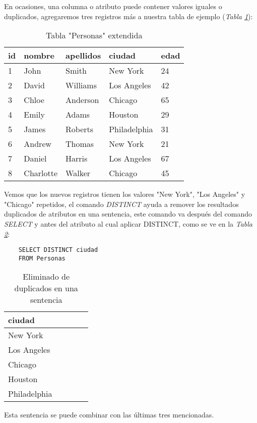 En ocasiones, una columna o atributo puede contener valores iguales o duplicados, agregaremos tres registros más a nuestra tabla de ejemplo (\textit{Tabla \ref{tab: 7}}):
\begin{table}[H]
    \centering
    \caption{Tabla "Personas" extendida}
    \label{tab: 7}
    \begin{tabular}{|l|l|l|l|l|}
        \hline
        \textbf{id} & \textbf{nombre} & \textbf{apellidos} & \textbf{ciudad} & \textbf{edad} \\
        \hline
        1 & John        & Smith     & New York      & 24 \\
        \hline
        2 & David       & Williams  & Los Angeles   & 42 \\
        \hline
        3 & Chloe       & Anderson  & Chicago       & 65 \\
        \hline
        4 & Emily       & Adams     & Houston       & 29 \\
        \hline
        5 & James       & Roberts   & Philadelphia  & 31 \\
        \hline
        6 & Andrew      & Thomas    & New York      & 21 \\
        \hline
        7 & Daniel      & Harris    & Los Angeles   & 67 \\
        \hline
        8 & Charlotte   & Walker    & Chicago       & 45 \\
        \hline
    \end{tabular}
\end{table}

Vemos que los nuevos registros tienen los valores "New York", "Los Angeles" y "Chicago" repetidos, el comando \textit{DISTINCT} ayuda a remover los resultados duplicados de atributos en una sentencia, este comando va después del comando \textit{SELECT} y antes del atributo al cual aplicar DISTINCT, como se ve en la \textit{Tabla \ref{tab: 8}}:
\begin{lstlisting}
    SELECT DISTINCT ciudad
    FROM Personas
\end{lstlisting}
\begin{table}[H]
    \centering
    \caption{Eliminado de duplicados en una sentencia}
    \label{tab: 8}
    \begin{tabular}{|l|l|l|l|l|}
        \hline
        \textbf{ciudad} \\
        \hline
        New York \\
        \hline
        Los Angeles \\
        \hline
        Chicago \\
        \hline
        Houston \\
        \hline
        Philadelphia \\
        \hline
    \end{tabular}
\end{table}

Esta sentencia se puede combinar con las últimas tres mencionadas.
